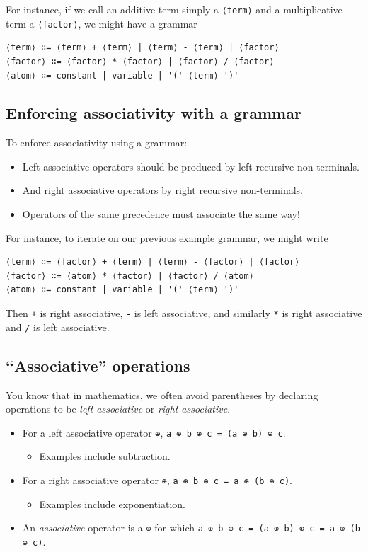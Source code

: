 \documentclass[11pt]{article}
\theoremstyle{definition}
\begin{document}
For instance, if we call an additive term simply a \texttt{⟨term⟩} and
a multiplicative term a \texttt{⟨factor⟩}, we might have a grammar
\begin{verbatim}
⟨term⟩ ∷= ⟨term⟩ + ⟨term⟩ | ⟨term⟩ - ⟨term⟩ | ⟨factor⟩
⟨factor⟩ ∷= ⟨factor⟩ * ⟨factor⟩ | ⟨factor⟩ / ⟨factor⟩
⟨atom⟩ ∷= constant | variable | '(' ⟨term⟩ ')'
\end{verbatim}

\subsection{Enforcing associativity with a grammar}
\label{sec:org1bf2b64}
To enforce associativity using a grammar:
\begin{itemize}
\item Left associative operators should be produced by left recursive
non-terminals.
\item And right associative operators by right recursive non-terminals.
\item Operators of the same precedence must associate the same way!
\end{itemize}

For instance, to iterate on our previous example grammar,
we might write
\begin{verbatim}
⟨term⟩ ∷= ⟨factor⟩ + ⟨term⟩ | ⟨term⟩ - ⟨factor⟩ | ⟨factor⟩
⟨factor⟩ ∷= ⟨atom⟩ * ⟨factor⟩ | ⟨factor⟩ / ⟨atom⟩
⟨atom⟩ ∷= constant | variable | '(' ⟨term⟩ ')'
\end{verbatim}
Then \texttt{+} is right associative, \texttt{-} is left associative,
and similarly \texttt{*} is right associative and \texttt{/} is left associative.

\subsection{“Associative” operations}
\label{sec:org6ad7544}
You know that in mathematics,
we often avoid parentheses by declaring operations
to be \emph{left associative} or \emph{right associative}.
\begin{itemize}
\item For a left associative operator \texttt{⊕},
\texttt{a ⊕ b ⊕ c = (a ⊕ b) ⊕ c}.
\begin{itemize}
\item Examples include subtraction.
\end{itemize}
\item For a right associative operator \texttt{⊕},
\texttt{a ⊕ b ⊕ c = a ⊕ (b ⊕ c)}.
\begin{itemize}
\item Examples include exponentiation.
\end{itemize}
\item An \emph{associative} operator is a \texttt{⊕} for which
\texttt{a ⊕ b ⊕ c = (a ⊕ b) ⊕ c = a ⊕ (b ⊕ c)}.
\end{itemize}
\end{document}
